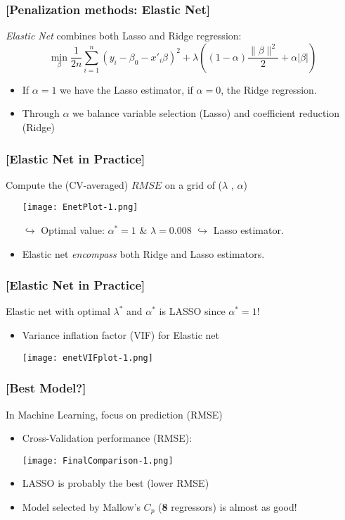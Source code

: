 \documentclass[xcolor=x11names,compress]{beamer}
\renewcommand{\(}{\begin{columns}}
\renewcommand{\)}{\end{columns}}
\newcommand{\<}[1]{\begin{column}{#1}}
\renewcommand{\>}{\end{column}}
\begin{document}
\begin{frame} %
\frametitle{\textcolor{brique}{[Penalization methods: Elastic Net]}}
\textit{Elastic Net} combines both Lasso and Ridge regression:
$$
\min_{\beta} \frac{1}{2n}
\sum_{i=1}^{n}{ \left( y_i - \beta_0 - x'_i\beta\right)^{2} } +
\lambda \left( (1-\alpha) \frac{ \|\beta\|^2}{2}  + \alpha |\beta| \right)
$$
\pause
\begin{itemize}[<+->]
\item If $\alpha=1$ we have the Lasso estimator, if  $\alpha=0$,  the Ridge regression.
\item Through $\alpha$ we balance variable selection (Lasso) and coefficient reduction (Ridge)
\end{itemize}
\end{frame}

\begin{frame} %
\frametitle{\textcolor{brique}{[Elastic Net in Practice]}}
Compute the (CV-averaged) $RMSE$ on a  grid of ($\lambda$ , $\alpha$)
\pause
\begin{itemize}[<+->]
\item[]  \texttt{[image: EnetPlot-1.png]}
\item[$\hookrightarrow$] Optimal value: $\alpha^* = 1$  \& $\lambda  = 0.008$  $\hookrightarrow$ Lasso estimator.
\item Elastic net \emph{encompass} both Ridge and Lasso estimators.
\end{itemize}
\end{frame}



\begin{frame} %
\frametitle{\textcolor{brique}{[Elastic Net in Practice]}}
Elastic net with  optimal $\lambda^*$ and $\alpha^*$ is LASSO since $\alpha^* = 1$!
\pause
\begin{itemize}[<+->]
\item Variance inflation factor (VIF)  for Elastic net
\item[] \texttt{[image: enetVIFplot-1.png]}
\end{itemize}
\end{frame}


\begin{frame} %
\frametitle{\textcolor{brique}{[Best Model?]}}
In Machine Learning, focus on prediction  (RMSE)
\pause
\begin{itemize}[<+->]
\item Cross-Validation performance (RMSE):
\item[] \texttt{[image: FinalComparison-1.png]}
\item LASSO is probably the best (lower RMSE)
\item Model selected by Mallow's $C_p$  (\textbf{8} regressors) is almost as good!
\end{itemize}
\end{frame}
\end{document}
